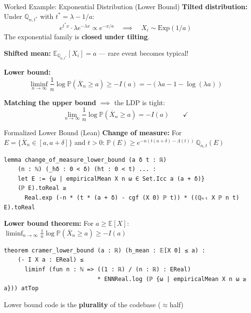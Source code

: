 \documentclass[aspectratio=169]{beamer}
\newcommand{\E}{\mathbb{E}}
\renewcommand{\P}{\mathbb{P}}
\newcommand{\Q}{\mathbb{Q}}
\begin{document}
\begin{frame}{Worked Example: Exponential Distribution (Lower Bound)}
  \textbf{Tilted distribution:} Under $\Q_{n,t^*}$ with $t^* = \lambda - 1/a$:
  \[
    e^{t^* x} \cdot \lambda e^{-\lambda x} \propto e^{-x/a} \quad\implies\quad X_i \sim \text{Exp}(1/a)
  \]
  The exponential family is \textbf{closed under tilting}.

  \vspace{0.3cm}
  \textbf{Shifted mean:} $\E_{\Q_{n,t^*}}[X_i] = a$ --- rare event becomes typical!

  \vspace{0.2cm}
  \textbf{Lower bound:}
  \[
    \liminf_{n\to\infty} \frac{1}{n}\log\P(\overline{X}_n \ge a) \ge -I(a) = -(\lambda a - 1 - \log(\lambda a))
  \]

  \vspace{0.2cm}
  \textbf{Matching the upper bound} $\implies$ the LDP is tight:
  \[
    \lim_{n\to\infty} \frac{1}{n}\log\P(\overline{X}_n \ge a) = -I(a) \qquad\checkmark
  \]
\end{frame}

\begin{frame}[fragile]{Formalized Lower Bound (Lean)}
  \textbf{Change of measure:} For $E = \{\overline{X}_n \in [a, a+\delta]\}$ and $t > 0$:
  $\P(E) \ge e^{-n(t(a+\delta) - \Lambda(t))}\, \Q_{n,t}(E)$
\begin{lstlisting}[basicstyle=\ttfamily\scriptsize]
lemma change_of_measure_lower_bound (a δ t : ℝ)
    (n : ℕ) (_hδ : 0 < δ) (ht : 0 < t) ... :
    let E := {ω | empiricalMean X n ω ∈ Set.Icc a (a + δ)}
    (ℙ E).toReal ≥
      Real.exp (-n * (t * (a + δ) - cgf (X 0) ℙ t)) * ((ℚₙₜ X ℙ n t) E).toReal
\end{lstlisting}
  \vspace{0.2cm}
  \textbf{Lower bound theorem:} For $a \ge \E[X]$: \;$\liminf_{n\to\infty} \frac{1}{n}\log\P(\overline{X}_n \ge a) \ge -I(a)$
\begin{lstlisting}[basicstyle=\ttfamily\scriptsize]
theorem cramer_lower_bound (a : ℝ) (h_mean : 𝔼[X 0] ≤ a) :
    (- I X a : EReal) ≤
      liminf (fun n : ℕ => ((1 : ℝ) / (n : ℝ) : EReal)
                           * ENNReal.log (ℙ {ω | empiricalMean X n ω ≥ a})) atTop
\end{lstlisting}
  \vspace{0.2cm}
  \begin{center}
    \small Lower bound code is the \textbf{plurality} of the codebase ($\approx$half)
  \end{center}
\end{frame}
\end{document}
